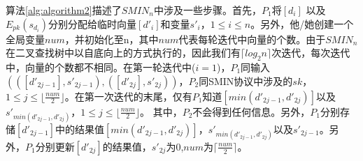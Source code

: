 算法\ref{alg:algorithm2}描述了$SMIN_n$中涉及一些步骤。首先，$P_1$将$[d_i]$ 以及$E_{pk}(s_{d_i})$分别分配给临时向量$[d'_i]$和变量$s'_i$，$1 \leq i \leq n$。另外，他/她创建一个全局变量$num$，并初始化至n，其中$num$代表每轮迭代中向量的个数。由于$SMIN_n$在二叉查找树中以自底向上的方式执行的，因此我们有$\lceil log_2n\rceil$次迭代，每次迭代中，向量的个数都不相同。在第一轮迭代中($i=1$)，$P_1$同输入$(([d'_{2j-1}],s'_{2j-1}),([d'_{2j}],s'_{2j}))$，$P_2$同SMIN协议中涉及的$sk$，$1 \leq j \leq \lfloor \frac{num}{2} \rfloor$。在第一次迭代的末尾，仅有$P_1$知道$[min(d'_{2j-1},d'_{2j})]$以及$s'_{min(d'_{2j-1},d'_{2j})}$，$1 \leq j\leq \lfloor \frac{num}{2} \rfloor$。 其中，$P_2$不会得到任何信息。另外，$P_1$分别存储$[d'_{2j-1}]$中的结果值$[min(d'_{2j-1},d'_{2j})]$，$s'_{min(d'_{2j-1},d'_{2j})}$以及$s'_{2j-1}$。另外，$P_1$分别更新$[d'_{2j}]$的结果值，$s'_{2j}$为0,$num$为$\lceil \frac{num}{2}\rceil$。
